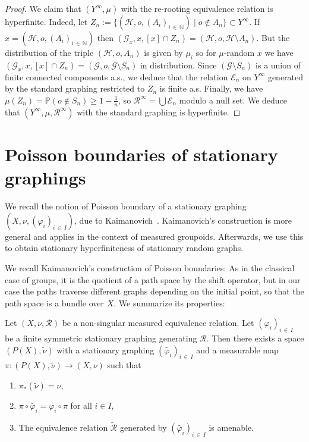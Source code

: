 \documentclass[AHL,Unicode,longabstracts,published]{cedram}
\newcommand{\bbN}{\mathbb{N}}
\newcommand{\bbP}{\mathbb{P}}
\newcommand{\calR}{\mathcal{R}}
\newcommand{\calH}{\mathcal{H}}
\newcommand{\calE}{\mathcal{E}}
\newcommand{\calG}{\mathcal{G}}
\begin{document}
\begin{proof}
We claim that $(Y^\infty,\mu)$ with the re-rooting equivalence relation is hyperfinite. Indeed, let $Z_n:=\{(\calH,o,(A_i)_{i\,\in\,\bbN}) \mid o\not\in A_n\}\subset Y^\infty$. If $x=(\calH,o,(A_i)_{i\,\in\,\bbN})$ then $(\calG_x,x,[x]\cap Z_n)=(\calH,o,\calH\setminus A_n)$. But the distribution of the triple $(\calH,o,A_n)$ is given by $\mu_i$ so for $\mu$-random $x$ we have $(\calG_x,x,[x]\cap Z_n)=(\calG,o,\calG\setminus S_n)$ in distribution. Since $(\calG\setminus S_n)$ is a union of finite connected components a.s., we deduce that the relation $\calE_n$ on $Y^\infty$ generated by the standard graphing restricted to $Z_n$ is finite a.s. Finally, we have $\mu(Z_n)=\bbP (o\not\in S_n)\geq 1-\frac{1}{n}$, so $\calR^\infty=\bigcup \calE_n$ modulo a null set. We deduce that $(Y^\infty, \mu,\calR^\infty)$ with the standard graphing is hyperfinite.
\end{proof}

\section{Poisson boundaries of stationary graphings}\label{sec:poissonSRG}

We recall the notion of Poisson boundary of a stationary graphing $(X,\nu,(\varphi_i)_{i\,\in \,I})$, due to Kaimanovich~\cite{Kai05}. Kaimanovich's construction is more general and applies in the context of measured groupoids. Afterwards, we use this to obtain stationary hyperfiniteness of stationary random graphs.

We recall Kaimanovich's construction of Poisson boundaries: As in the classical case of groups, it is the quotient of a path space by the shift operator, but in our case the paths traverse different graphs depending on the initial point, so that the path space is a bundle over $X$. We summarize its properties:


\begin{prop} \label{prop:PoissonRSG}
Let $(X,\nu,\calR)$ be a non-singular measured equivalence relation. Let $(\varphi_i)_{i\,\in\,I}$ be a finite symmetric stationary graphing generating $\calR$. Then there exists a space $(P(X),\widetilde{\nu})$ with a stationary graphing $(\widetilde{\varphi_i})_{i\,\in\,I}$ and a measurable map $\pi\colon (P(X),\widetilde{\nu})\to (X,\nu)$ such that
\begin{enumerate}
\item\label{prop4.1.1} $\pi_*(\widetilde{\nu})=\nu$,
\item\label{prop4.1.2} $\pi\circ \widetilde{\varphi_i}=\varphi_i\circ \pi$ for all $i\in I$,
\item\label{prop4.1.3} The equivalence relation $\widetilde{\calR}$ generated by $(\widetilde{\varphi_i})_{i\,\in\,I}$ is amenable.
\end{enumerate}
\end{prop}
\end{document}

